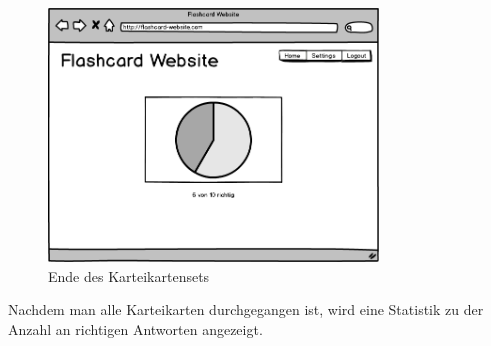 \begin{figure}[H]
    \centering
    \includegraphics[width=0.78\textwidth]{images/Lernscreen-Ergebnis.png}
    \caption{Ende des Karteikartensets}
    \label{fig:lernscreen-ergbenis}
\end{figure}

Nachdem man alle Karteikarten durchgegangen ist, wird eine Statistik zu der Anzahl an richtigen Antworten angezeigt.
